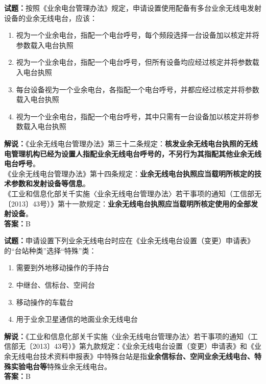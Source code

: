 \documentclass{ctexbook}
\begin{document}
\bigskip

\noindent\textbf{试题：}按照《业余电台管理办法》规定，申请设置使用配备有多台业余无线电发射设备的业余无线电台，应该：
\begin{enumerate}[leftmargin=3em]
  \item 视为一个业余电台，指配一个电台呼号，每个频段选择一台设备加以核定并将参数载入电台执照
  \item 视为一个业余电台，指配一个电台呼号，但所有设备均应经过核定并将参数载入电台执照
  \item 每台设备视为一个业余电台，各指配一个电台呼号，并都应经过核定并将参数载入电台执照
  \item 视为一个业余电台，指配一个电台呼号，其中只需有一台设备加以核定并将参数载入电台执照
\end{enumerate}
\noindent\textbf{解说：}《业余无线电台管理办法》第三十二条规定：\textbf{核发业余无线电台执照的无线电管理机构已经为设置人指配业余无线电台呼号的，不另行为其指配其他业余无线电台呼号}。\\
《业余无线电台管理办法》第十四条规定：\textbf{业余无线电台执照应当载明所核定的技术参数和发射设备等信息}。\\
《工业和信息化部关千实施〈业余无线电台管理办法〉若干事项的通知（工信部无〔2013〕43号）》第十一款规定：\textbf{业余无线电台执照应当载明所核定使用的全部发射设备}。\\\noindent\textbf{答案：}B

\bigskip

\noindent\textbf{试题：}申请设置下列业余无线电台时应在《业余无线电台设置（变更）申请表》 的“台站种类”选择“特殊”类：
\begin{enumerate}[leftmargin=3em]
  \item 需要到外地移动操作的手持台
  \item 中继台、信标台、空间台
  \item 移动操作的车载台
  \item 用于业余卫星通信的地面业余无线电台
\end{enumerate}
\noindent\textbf{解说：}《工业和信息化部关千实施〈业余无线电台管理办法〉若干事项的通知（工信部无〔2013〕43号）》第九款规定：《业余无线电台设置（变更）申请表》和《业余无线电台技术资料申报表》中特殊台站是指\textbf{业余信标台、空间业余无线电台、特殊实验电台等}特殊业余无线电台。\\\noindent\textbf{答案：}B

\bigskip
\end{document}
